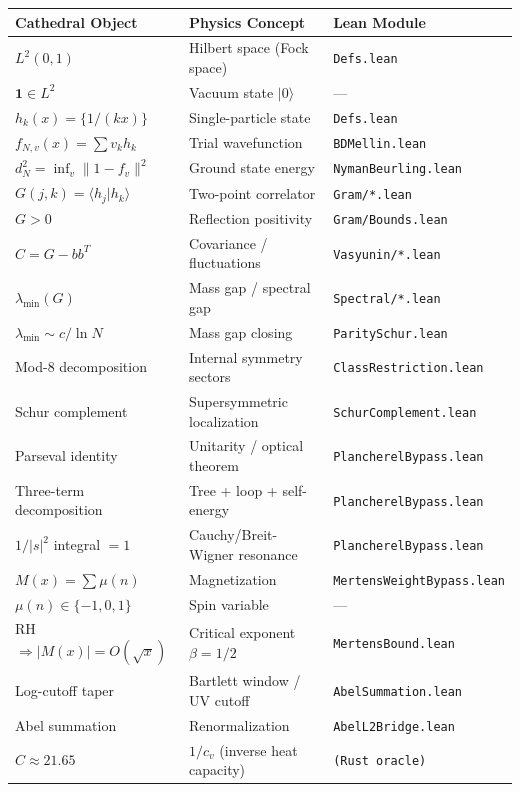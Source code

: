 \documentclass[11pt,a4paper]{article}
\theoremstyle{definition}
\newcommand{\fract}[1]{\{#1\}}
\newcommand{\lean}[1]{\texttt{#1}}
\newcommand{\ket}[1]{| #1 \rangle}
\newcommand{\braket}[2]{\langle #1 | #2 \rangle}
\begin{document}
\begin{table}[h]
\centering
\small
\begin{tabular}{@{}lll@{}}
\toprule
\textbf{Cathedral Object} & \textbf{Physics Concept} & \textbf{Lean Module} \\
\midrule
$L^2(0,1)$ & Hilbert space (Fock space) & \lean{Defs.lean} \\
$\mathbf{1} \in L^2$ & Vacuum state $\ket{0}$ & --- \\
$h_k(x) = \fract{1/(kx)}$ & Single-particle state & \lean{Defs.lean} \\
$f_{N,v}(x) = \sum v_k h_k$ & Trial wavefunction & \lean{BDMellin.lean} \\
$d_N^2 = \inf_v \|1 - f_v\|^2$ & Ground state energy & \lean{NymanBeurling.lean} \\
$G(j,k) = \braket{h_j}{h_k}$ & Two-point correlator & \lean{Gram/*.lean} \\
$G > 0$ & Reflection positivity & \lean{Gram/Bounds.lean} \\
$C = G - bb^T$ & Covariance / fluctuations & \lean{Vasyunin/*.lean} \\
$\lambda_{\min}(G)$ & Mass gap / spectral gap & \lean{Spectral/*.lean} \\
$\lambda_{\min} \sim c/\ln N$ & Mass gap closing & \lean{ParitySchur.lean} \\
Mod-8 decomposition & Internal symmetry sectors & \lean{ClassRestriction.lean} \\
Schur complement & Supersymmetric localization & \lean{SchurComplement.lean} \\
Parseval identity & Unitarity / optical theorem & \lean{PlancherelBypass.lean} \\
Three-term decomposition & Tree + loop + self-energy & \lean{PlancherelBypass.lean} \\
$1/|s|^2$ integral $= 1$ & Cauchy/Breit-Wigner resonance & \lean{PlancherelBypass.lean} \\
$M(x) = \sum \mu(n)$ & Magnetization & \lean{MertensWeightBypass.lean} \\
$\mu(n) \in \{-1,0,1\}$ & Spin variable & --- \\
RH $\Rightarrow |M(x)| = O(\sqrt{x})$ & Critical exponent $\beta = 1/2$ & \lean{MertensBound.lean} \\
Log-cutoff taper & Bartlett window / UV cutoff & \lean{AbelSummation.lean} \\
Abel summation & Renormalization & \lean{AbelL2Bridge.lean} \\
$C \approx 21.65$ & $1/c_v$ (inverse heat capacity) & \lean{(Rust oracle)} \\

\end{tabular}
\end{table}
\end{document}

